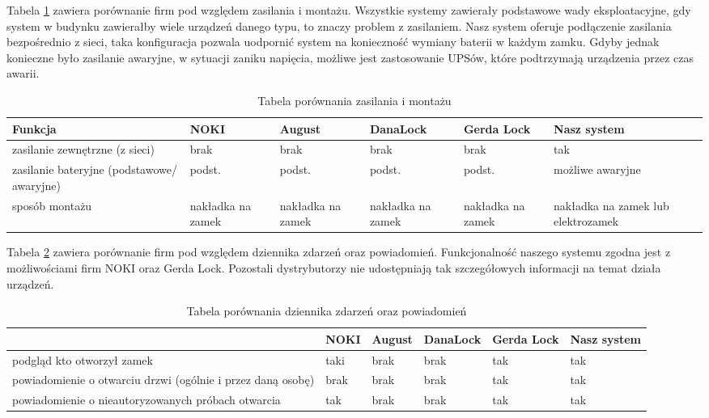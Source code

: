  	\newpage
 	Tabela \ref{tab:porownanie2} zawiera porównanie firm pod względem zasilania i montażu. Wszystkie systemy zawierały podstawowe wady eksploatacyjne, gdy system w budynku zawierałby wiele urządzeń danego typu, to znaczy problem z zasilaniem. Nasz system oferuje podłączenie zasilania bezpośrednio z sieci, taka konfiguracja pozwala uodpornić system na konieczność wymiany baterii w każdym zamku. Gdyby jednak konieczne było zasilanie awaryjne, w sytuacji zaniku napięcia, możliwe jest zastosowanie UPSów, które podtrzymają urządzenia przez czas awarii.
 \begin{longtable}[!ht]{|p{2.9cm}|p{1.45cm}|p{1.45cm}|p{}|p{}|p{}|} 
 	\caption{Tabela porównania zasilania i montażu}
 	\label{tab:porownanie2}\\
 	\hline	
 	Funkcja & NOKI & August & DanaLock & Gerda Lock & Nasz \linebreak system \\	\hline
 	zasilanie zewnętrzne (z sieci)	
 	& brak & brak & brak & brak & tak \\	\hline
	 zasilanie bateryjne (podstawowe/ awaryjne)	
	 & podst. & podst. &podst. & podst. & możliwe awaryjne \\	\hline
 	sposób montażu	
 	& nakładka na zamek & nakładka na zamek & nakładka na zamek & nakładka na zamek & nakładka na zamek lub elektrozamek  \\	\hline
 \end{longtable}
 
Tabela \ref{tab:porownanie3} zawiera porównanie firm pod względem dziennika zdarzeń oraz powiadomień. Funkcjonalność naszego systemu zgodna jest z możliwościami firm NOKI oraz Gerda Lock. Pozostali dystrybutorzy nie udostępniają tak szczegółowych informacji na temat działa urządzeń.
\begin{longtable}[!ht]{|p{4cm}|p{1cm}|p{1cm}|p{}|p{1cm}|p{}|} 
	\caption{Tabela porównania dziennika zdarzeń oraz powiadomień}
	\label{tab:porownanie3}\\
	\hline	
	& NOKI & August & DanaLock & Gerda Lock & Nasz system \\	\hline
	podgląd kto otworzył zamek
	& taki & brak & brak & tak & tak \\	\hline
	powiadomienie o otwarciu drzwi (ogólnie i przez daną osobę)
	& brak & brak & brak & tak & tak  \\	\hline
	powiadomienie o nieautoryzowanych próbach otwarcia
	& tak & brak & brak & tak & tak  \\	\hline
\end{longtable}

